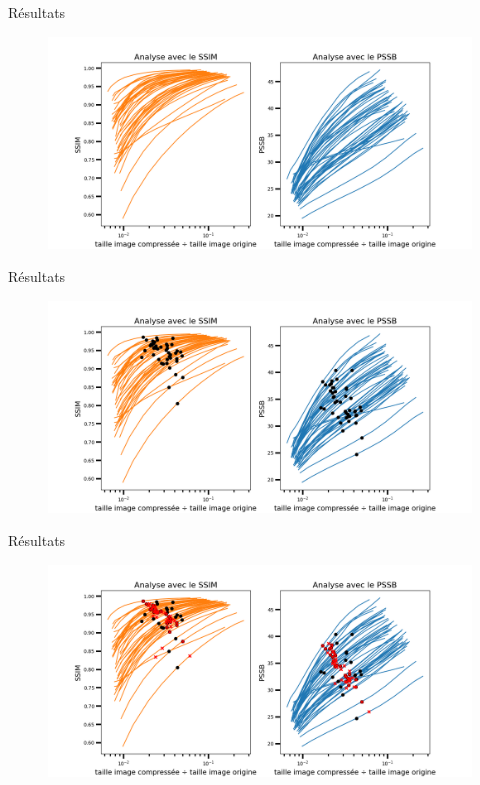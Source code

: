 \documentclass[xcolor=dvipsnames]{beamer}
\begin{document}
\begin{frame} {Résultats}
    \begin{figure}
        \centering
        \includegraphics[width=1\linewidth]{graphe1.png}
    \end{figure}
    
\end{frame}

\begin{frame} {Résultats}
    \begin{figure}
        \centering
        \includegraphics[width=1\linewidth]{graphe2.png}
    \end{figure}
    
\end{frame}

\begin{frame} {Résultats}
    \centering
    \begin{figure}
        \centering
        \includegraphics[width=1\linewidth]{graphe3.png}
    \end{figure}
    
\end{frame}
\end{document}
